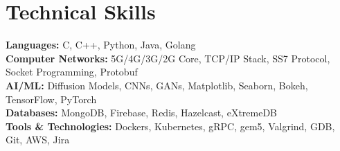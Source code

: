 \section{Technical Skills}
\begin{itemize}[leftmargin=0.15in, label={}]
	\small{\item{
			\textbf{Languages:} C, C++, Python, Java, Golang\\
			\textbf{Computer Networks:} 5G/4G/3G/2G Core, TCP/IP Stack, SS7 Protocol, Socket Programming, Protobuf\\
			\textbf{AI/ML:} Diffusion Models, CNNs, GANs, Matplotlib, Seaborn, Bokeh, TensorFlow, PyTorch\\
			\textbf{Databases:} MongoDB, Firebase, Redis, Hazelcast, eXtremeDB\\
			\textbf{Tools \& Technologies:} Dockers, Kubernetes, gRPC, gem5, Valgrind, GDB, Git, AWS, Jira\\}
		}
\end{itemize}